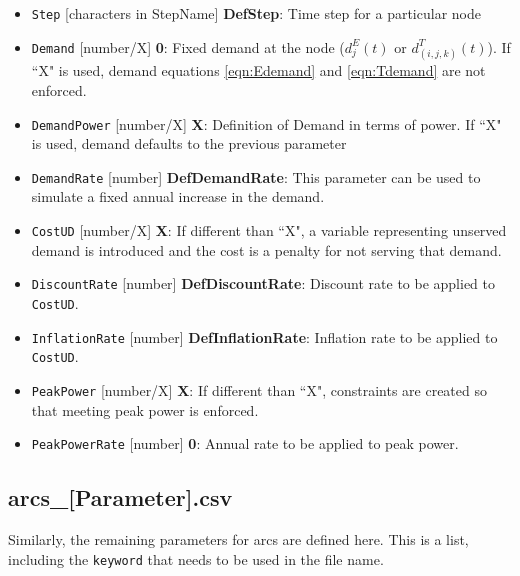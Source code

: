 \documentclass{article}
\begin{document}
\begin{itemize}
  \item \verb=Step= [characters in StepName] \textbf{DefStep}: Time step for a particular node
  \item \verb=Demand= [number/X] \textbf{0}: Fixed demand at the node ($d^E_j(t)$ or $d^T_{(i,j,k)}(t)$). If ``X" is used, demand equations \ref{eqn:Edemand} and \ref{eqn:Tdemand} are not enforced.
  \item \verb=DemandPower= [number/X] \textbf{X}:  Definition of Demand in terms of power. If ``X" is used, demand defaults to the previous parameter
  \item \verb=DemandRate= [number] \textbf{DefDemandRate}: This parameter can be used to simulate a fixed annual increase in the demand.
  \item \verb=CostUD= [number/X] \textbf{X}:  If different than ``X", a variable representing unserved demand is introduced and the cost is a penalty for not serving that demand.
  \item \verb=DiscountRate= [number] \textbf{DefDiscountRate}: Discount rate to be applied to \verb=CostUD=.
  \item \verb=InflationRate= [number] \textbf{DefInflationRate}: Inflation rate to be applied to \verb=CostUD=.
  \item \verb=PeakPower= [number/X] \textbf{X}:  If different than ``X", constraints are created so that meeting peak power is enforced.
  \item \verb=PeakPowerRate= [number] \textbf{0}: Annual rate to be applied to peak power.
\end{itemize}


\subsection{arcs\_[Parameter].csv}

Similarly, the remaining parameters for arcs are defined here. This is a list, including the \verb=keyword= that needs to be used in the file name.
\end{document}
